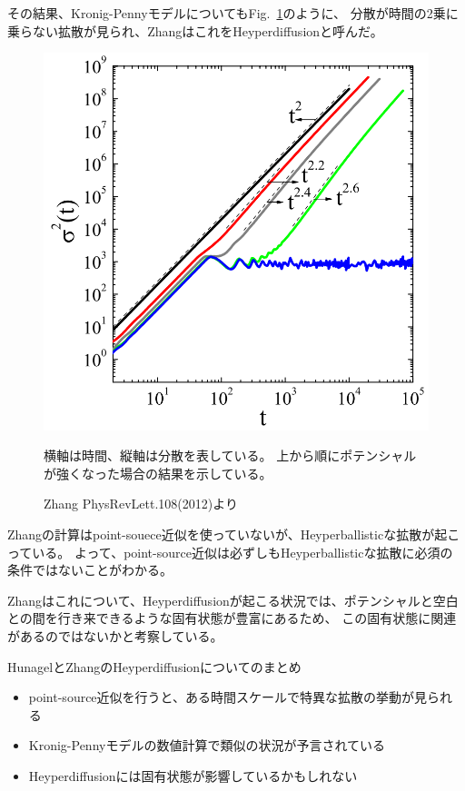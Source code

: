 \documentclass[autodetect-engine,dvipdfmx-if-dvi,ja=standard,a4paper,layout=v2]{bxjsreport}
\newcommand{\fref}[1]{Fig.~\ref{#1}}
\begin{document}
    その結果、Kronig-Pennyモデルについても\fref{Zhang}のように、
    分散が時間の2乗に乗らない拡散が見られ、ZhangはこれをHeyperdiffusionと呼んだ。\par
    \begin{figure}[h]
      \centering
      \includegraphics[width=70truemm]{figure_3.png}
      \caption{Zhang PhysRevLett.108(2012)より}
      \label{Zhang}
      \footnotesize{横軸は時間、縦軸は分散を表している。
      上から順にポテンシャルが強くなった場合の結果を示している。}
    \end{figure}
    Zhangの計算はpoint-souece近似を使っていないが、Heyperballisticな拡散が起こっている。
    よって、point-source近似は必ずしもHeyperballisticな拡散に必須の条件ではないことがわかる。\par
    Zhangはこれについて、Heyperdiffusionが起こる状況では、ポテンシャルと空白との間を行き来できるような固有状態が豊富にあるため、
    この固有状態に関連があるのではないかと考察している。
    \begin{itembox}[l]{HunagelとZhangのHeyperdiffusionについてのまとめ}
        \begin{itemize}
            \item point-source近似を行うと、ある時間スケールで特異な拡散の挙動が見られる
            \item Kronig-Pennyモデルの数値計算で類似の状況が予言されている
            \item Heyperdiffusionには固有状態が影響しているかもしれない
        \end{itemize}
    \end{itembox}
\end{document}
